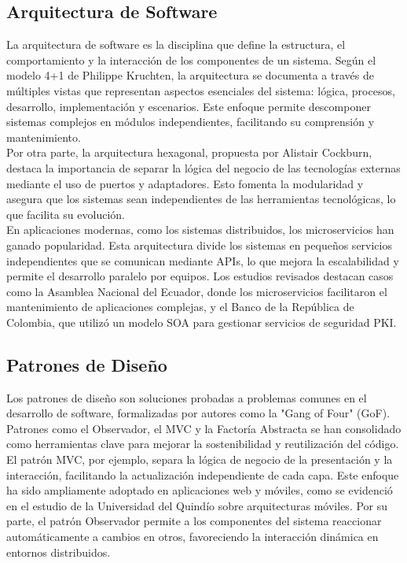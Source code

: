 \documentclass[conference]{IEEEtran}
\begin{document}
\subsection{Arquitectura de Software}
La arquitectura de software es la disciplina que define la estructura, el comportamiento y la interacción de los componentes de un sistema. Según el modelo 4+1 de Philippe Kruchten, la arquitectura se documenta a través de múltiples vistas que representan aspectos esenciales del sistema: lógica, procesos, desarrollo, implementación y escenarios. Este enfoque permite descomponer sistemas complejos en módulos independientes, facilitando su comprensión y mantenimiento.\\

Por otra parte, la arquitectura hexagonal, propuesta por Alistair Cockburn, destaca la importancia de separar la lógica del negocio de las tecnologías externas mediante el uso de puertos y adaptadores. Esto fomenta la modularidad y asegura que los sistemas sean independientes de las herramientas tecnológicas, lo que facilita su evolución.\\

En aplicaciones modernas, como los sistemas distribuidos, los microservicios han ganado popularidad. Esta arquitectura divide los sistemas en pequeños servicios independientes que se comunican mediante APIs, lo que mejora la escalabilidad y permite el desarrollo paralelo por equipos. Los estudios revisados destacan casos como la Asamblea Nacional del Ecuador, donde los microservicios facilitaron el mantenimiento de aplicaciones complejas, y el Banco de la República de Colombia, que utilizó un modelo SOA para gestionar servicios de seguridad PKI.\\

\subsection{Patrones de Diseño}
Los patrones de diseño son soluciones probadas a problemas comunes en el desarrollo de software, formalizadas por autores como la "Gang of Four" (GoF). Patrones como el Observador, el MVC y la Factoría Abstracta se han consolidado como herramientas clave para mejorar la sostenibilidad y reutilización del código.\\

El patrón MVC, por ejemplo, separa la lógica de negocio de la presentación y la interacción, facilitando la actualización independiente de cada capa. Este enfoque ha sido ampliamente adoptado en aplicaciones web y móviles, como se evidenció en el estudio de la Universidad del Quindío sobre arquitecturas móviles. Por su parte, el patrón Observador permite a los componentes del sistema reaccionar automáticamente a cambios en otros, favoreciendo la interacción dinámica en entornos distribuidos.\\
\end{document}
